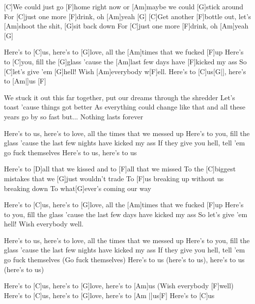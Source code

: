 


\begin{guitar}
	[C]We could just go [F]home right now or [Am]maybe we could [G]stick around
	For [C]just one more [F]drink, oh [Am]yeah [G]{}
	[C]Get another [F]bottle out, let's [Am]shoot the shit, [G]sit back down
	For [C]just one more [F]drink, oh [Am]yeah [G]{}
	
	\begin{highlightbar}
		Here's to [C]us, here's to [G]love, all the [Am]times that we fucked [F]up
		Here's to [C]you, fill the [G]glass 'cause the [Am]last few days have [F]kicked my ass
		So [C]let's give 'em [G]hell! Wish [Am]everybody w[F]ell.
		Here's to [C]us[G|], here's to [Am|]{us} [F]{}
	\end{highlightbar}
	
	\songsection{Verse 2}
	We stuck it out this far together, put our dreams through the shredder
	Let's toast 'cause things got better
	As everything could change like that and all these years go by so fast but...
	Nothing lasts forever
	
	\begin{highlightbar}
		\songsection{Chorus}
		Here's to us, here's to love, all the times that we messed up
		Here's to you, fill the glass 'cause the last few nights have kicked my ass
		If they give you hell, tell 'em go fuck themselves
		Here's to us, here's to us
	\end{highlightbar}
	
	\songsection{Bridge}
	Here's to [D]all that we kissed and to [F]all that we missed
	To the [C]biggest mistakes that we [G]just wouldn't trade
	To [F]us breaking up without us breaking down
	To what[G]ever's coming our way
	
	\begin{highlightbar}
		Here's to [C]us, here's to [G]love, all the [Am]times that we fucked [F]up
		Here's to you, fill the glass 'cause the last few days have kicked my ass
		So let's give 'em hell! Wish everybody well.
		
		Here's to us, here's to love, all the times that we messed up
		Here's to you, fill the glass 'cause the last few nights have kicked my ass
		If they give you hell, tell 'em go fuck themselves (Go fuck themselves)
		Here's to us (here's to us), here's to us (here's to us)
	\end{highlightbar}
	
	Here's to [C]us, here's to [G]love, here's to [Am]us (Wish everybody [F]well)
	Here's to [C]us, here's to [G]love, here's to [Am |]{us}[F]{}
	Here's to [C]us
\end{guitar}
